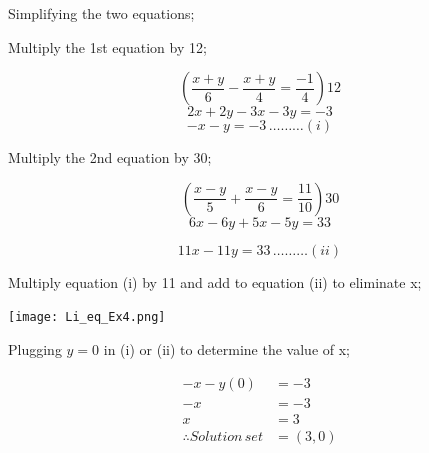 \documentclass[
  letterpaper,
  DIV=11,
  numbers=noendperiod]{scrreprt}
\begin{document}
\begin{tcolorbox}[enhanced jigsaw, leftrule=.75mm, opacityback=0, toprule=.15mm, bottomrule=.15mm, breakable, title=\textcolor{quarto-callout-caution-color}{\faFire}\hspace{0.5em}{Solution}, opacitybacktitle=0.6, titlerule=0mm, colframe=quarto-callout-caution-color-frame, rightrule=.15mm, coltitle=black, colback=white, bottomtitle=1mm, toptitle=1mm, left=2mm, colbacktitle=quarto-callout-caution-color!10!white, arc=.35mm]

Simplifying the two equations;

Multiply the 1st equation by 12;

\[\left(\frac{x+y}{6}-\frac{x+y}{4}=\frac{-1}{4}\right)12\]
\[2x+2y-3x-3y=-3\] \[-x-y=-3 \,\ldots \ldots\ldots(i)\]

Multiply the 2nd equation by 30;

\[\left(\frac{x-y}{5}+\frac{x-y}{6}=\frac{11}{10}\right)30\]
\[6x-6y+5x-5y=33\]

\[11x-11y=33 \, \ldots\ldots\ldots (ii)\]

Multiply equation (i) by 11 and add to equation (ii) to eliminate x;

\texttt{[image: Li\_eq\_Ex4.png]}

Plugging \(y= 0\) in (i) or (ii) to determine the value of x;

\[
\begin{align*}
-x-y(0)&=-3\\
-x&=-3\\x&=3\\
\therefore Solution \,set&=(3,0)
\end{align*}
\]

\end{tcolorbox}
\end{document}
